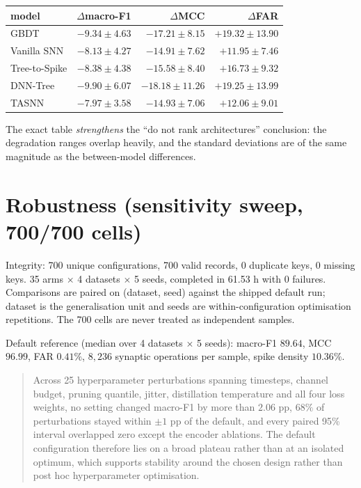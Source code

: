 \begin{center}\small
\begin{tabular}{lrrr}\toprule
model & $\Delta$macro-F1 & $\Delta$MCC & $\Delta$FAR \\\midrule
GBDT           & $-9.34 \pm 4.63$ & $-17.21 \pm 8.15$  & $+19.32 \pm 13.90$ \\
Vanilla SNN    & $-8.13 \pm 4.27$ & $-14.91 \pm 7.62$  & $+11.95 \pm 7.46$ \\
Tree-to-Spike  & $-8.38 \pm 4.38$ & $-15.58 \pm 8.40$  & $+16.73 \pm 9.32$ \\
DNN-Tree       & $-9.90 \pm 6.07$ & $-18.18 \pm 11.26$ & $+19.25 \pm 13.99$ \\
TASNN          & $-7.97 \pm 3.58$ & $-14.93 \pm 7.06$  & $+12.06 \pm 9.01$ \\
\bottomrule\end{tabular}\end{center}

\noindent The exact table \emph{strengthens} the ``do not rank architectures''
conclusion: the degradation ranges overlap heavily, and the standard deviations are of the
same magnitude as the between-model differences.

\section*{Robustness (sensitivity sweep, 700/700 cells)}

Integrity: 700 unique configurations, 700 valid records, 0 duplicate keys, 0 missing
keys. 35 arms $\times$ 4 datasets $\times$ 5 seeds, completed in 61.53 h with 0
failures. Comparisons are paired on (dataset, seed) against the shipped default run;
dataset is the generalisation unit and seeds are within-configuration optimisation
repetitions. The 700 cells are never treated as independent samples.

Default reference (median over 4 datasets $\times$ 5 seeds): macro-F1 $89.64$,
MCC $96.99$, FAR $0.41\%$, $8{,}236$ synaptic operations per sample, spike
density $10.36\%$.

\begin{quote}
Across 25 hyperparameter perturbations spanning timesteps, channel budget, pruning
quantile, jitter, distillation temperature and all four loss weights, no setting
changed macro-F1 by more than $2.06$ pp, $68\%$ of perturbations stayed within
$\pm1$ pp of the default, and every paired 95\% interval overlapped zero except the
encoder ablations. The default configuration therefore lies on a broad plateau rather
than at an isolated optimum, which supports stability around the chosen design rather
than post hoc hyperparameter optimisation.
\end{quote}

